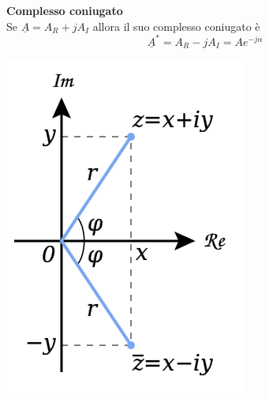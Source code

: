 \documentclass{article}
\begin{document}
\textbf{Complesso coniugato}
\vspace*{0.1cm}\\
Se $\underline{A}=A_R+jA_I$ allora il suo complesso coniugato è
\[
    \underline{A}^* = A_R - jA_I = Ae^{-j \alpha}
\]
\begin{center}
    \includegraphics[scale=0.3]{Image/Complex_conjugate_picture.svg.png}
\end{center}
\end{document}
